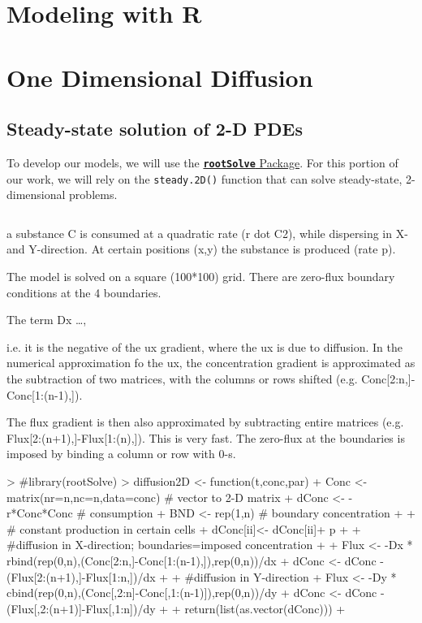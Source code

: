 \documentclass{article}
\begin{document}
\section{Modeling with R}

\section{One Dimensional Diffusion}


\subsection{Steady-state solution of 2-D PDEs}

To develop our models, we will use the \href{https://cran.r-project.org/web/packages/rootSolve/vignettes/rootSolve.pdf}{\texttt{\textbf{rootSolve}} Package}. For this portion of our work, we will rely on the \texttt{steady.2D()} function that can solve steady-state, 2-dimensional problems.

\begin{equation}
\end{equation}

a substance C is consumed at a quadratic rate (r dot C2), while dispersing in X- and Y-direction.
At certain positions (x,y) the substance is produced (rate p).

The model is solved on a square (100*100) grid. There are zero-flux boundary conditions at
the 4 boundaries.

The term Dx \ldots, 

i.e. it is the negative of the 
ux gradient, where the ux is due to diffusion. In the numerical approximation fo the 
ux, the concentration gradient is approximated as the subtraction of two matrices, with the columns or rows shifted (e.g. Conc[2:n,]-Conc[1:(n-1),]).

The flux gradient is then also approximated by subtracting entire matrices (e.g. Flux[2:(n+1),]-Flux[1:(n),]). This is very fast. The zero-flux at the boundaries is imposed by binding a column or row with 0-s.


\begin{Schunk}
\begin{Sinput}
> #library(rootSolve)
> diffusion2D <- function(t,conc,par){
+ Conc <- matrix(nr=n,nc=n,data=conc) # vector to 2-D matrix
+ dConc <- -r*Conc*Conc # consumption
+ BND <- rep(1,n) # boundary concentration
+ 
+ # constant production in certain cells
+ dConc[ii]<- dConc[ii]+ p
+ 
+ #diffusion in X-direction; boundaries=imposed concentration
+ 
+ Flux <- -Dx * rbind(rep(0,n),(Conc[2:n,]-Conc[1:(n-1),]),rep(0,n))/dx
+ dConc <- dConc - (Flux[2:(n+1),]-Flux[1:n,])/dx
+ 
+ #diffusion in Y-direction
+ Flux <- -Dy * cbind(rep(0,n),(Conc[,2:n]-Conc[,1:(n-1)]),rep(0,n))/dy
+ dConc <- dConc - (Flux[,2:(n+1)]-Flux[,1:n])/dy
+ 
+ return(list(as.vector(dConc)))
+ }
\end{Sinput}
\end{Schunk}
\end{document}
